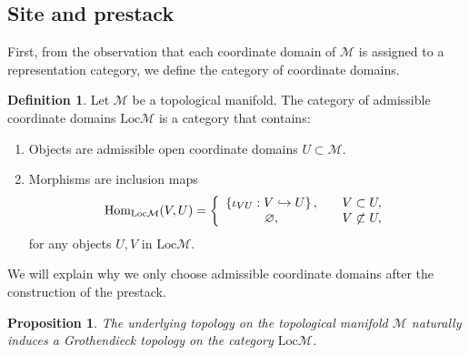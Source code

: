 \documentclass[reqno]{amsart}
\newtheorem{proposition}[formula]{Proposition}
\theoremstyle{definition}
\newtheorem{definition}[formula]{Definition}
\theoremstyle{remark}
\begin{document}
\subsection{Site and prestack}
First, from the observation that each coordinate domain of $\mathcal{M}$ is assigned to a representation category, we define the category of coordinate domains.
\begin{definition}
    Let $\mathcal{M}$ be a topological manifold. The category of admissible coordinate domains $\text{Loc}\mathcal{M}$ is a category that contains:
    \begin{enumerate}
        \item Objects are admissible open coordinate domains $U\subset \mathcal{M}$.
        \item Morphisms are inclusion maps
        \begin{equation}
            \begin{split}
                \text{Hom}_{\text{Loc}\mathcal{M}}(V,U) =\left\{ 
                \begin{array}{c l}
                     \left\{\iota_{VU}:V\hookrightarrow U\right\}, &\quad V\subset U, \\
                     \varnothing,  &\quad V \not\subset U,
                \end{array}\right.
            \end{split}
        \end{equation}
        for any objects $U,V$ in $\text{Loc}\mathcal{M}$.
    \end{enumerate}
\end{definition}
We will explain why we only choose admissible coordinate domains after the construction of the prestack.

\begin{proposition}
    The underlying topology on the topological manifold $\mathcal{M}$ naturally induces a Grothendieck topology on the category $\text{Loc}\mathcal{M}$.
\end{proposition}
\end{document}
